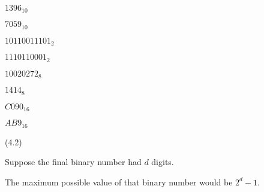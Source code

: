 \documentclass{exam}
\begin{document}
\begin{questions}
\begin{subparts}
\begin{center} \(1396_{10}\) \end{center}


\begin{center} \(7059_{10}\) \end{center}

\end{subparts}

\begin{subparts}

\begin{center} \(10110011101_{2}\) \end{center}


\begin{center} \(1110110001_{2}\) \end{center}


\begin{center} \(10020272_{8}\) \end{center}


\begin{center} \(1414_{8}\) \end{center}


\begin{center} \(C090_{16}\) \end{center}


\begin{center} \(AB9_{16}\) \end{center}

\end{subparts}

 (4.2)

\begin{center}
Suppose the final binary number had \(d\) digits.

The maximum possible value of that binary number would be \(2^d - 1\).


\end{center}
\end{questions}
\end{document}
